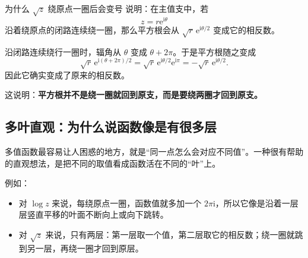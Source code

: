 \begin{lizi}{为什么 $\sqrt{z}$ 绕原点一圈后会变号}{}
说明：在主值支中，若
\[
    z=r\mathrm{e}^{\mathrm{i}\theta}
\]
沿着绕原点的闭路连续绕一圈，那么平方根会从 $\sqrt{r}\,\mathrm{e}^{\mathrm{i}\theta/2}$ 变成它的相反数。

\begin{jie}
沿闭路连续绕行一圈时，辐角从 $\theta$ 变成 $\theta+2\pi$。于是平方根随之变成
\[
    \sqrt{r}\,\mathrm{e}^{\mathrm{i}(\theta+2\pi)/2}
    =
    \sqrt{r}\,\mathrm{e}^{\mathrm{i}\theta/2}\mathrm{e}^{\mathrm{i}\pi}
    =
    -\sqrt{r}\,\mathrm{e}^{\mathrm{i}\theta/2}.
\]
因此它确实变成了原来的相反数。

这说明：\textbf{平方根并不是绕一圈就回到原支，而是要绕两圈才回到原支。}
\end{jie}
\end{lizi}

\subsection{多叶直观：为什么说函数像是有很多层}

多值函数最容易让人困惑的地方，就是``同一点怎么会对应不同值''。一种很有帮助的直观想法，是把不同的取值看成函数活在不同的``叶''上。

例如：
\begin{itemize}
    \item 对 $\log z$ 来说，每绕原点一圈，函数值就多加一个 $2\pi\mathrm{i}$，所以它像是沿着一层层竖直平移的叶面不断向上或向下跳转。
    \item 对 $\sqrt{z}$ 来说，只有两层：第一层取一个值，第二层取它的相反数；绕一圈就跳到另一层，再绕一圈才回到原层。
\end{itemize}

